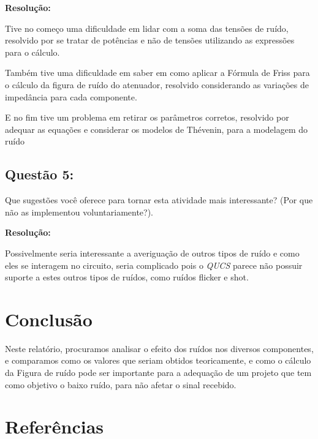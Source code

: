 \documentclass[a4paper,12pt]{proc}
\begin{document}
\textbf{Resolução:}

\singlespacing

\noindent Tive no começo uma dificuldade em lidar com a soma das tensões de ruído, resolvido por se tratar de potências e não de tensões utilizando as expressões para o cálculo.

\noindent Também tive uma dificuldade em saber em como aplicar a Fórmula de Friss para o cálculo da figura de ruído do atenuador, resolvido considerando as variações de impedância para cada componente.

\noindent E no fim tive um problema em retirar os parâmetros corretos, resolvido por adequar as equações e considerar os modelos de Thévenin, para a modelagem do ruído

\subsection{Questão 5:}
Que sugestões você oferece para tornar esta atividade mais interessante? (Por que não as implementou voluntariamente?).

\singlespacing

\textbf{Resolução:}

\singlespacing

\noindent Possivelmente seria interessante a averiguação de outros tipos de ruído e como eles se interagem no circuito, seria complicado pois o \textit{QUCS} parece não possuir  suporte a estes outros tipos de ruídos, como ruídos flicker e shot.

\section{Conclusão}

Neste relatório, procuramos analisar o efeito dos ruídos nos diversos componentes, e comparamos como os valores que seriam obtidos teoricamente, e como o cálculo da Figura de ruído pode ser importante para a adequação de um projeto que tem como objetivo o baixo ruído, para não afetar o sinal recebido.

\section{Referências}

\nocite{*}



\end{document}
